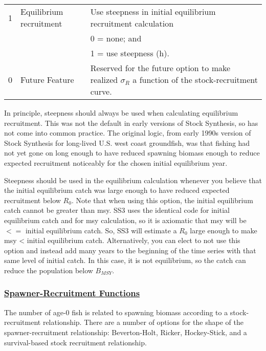 \begin{longtable}{p{1cm} p{3cm} p{11cm}}
	\hline

	1 \Tstrut & Equilibrium recruitment & Use steepness in initial equilibrium recruitment calculation \\
	  & 						& 0 = none; and \\
	  &							& 1 = use steepness (h). \\
	0 & Future Feature			& Reserved for the future option to make realized $\sigma_R$ a function of the stock-recruitment curve. \Bstrut\\ 
	\hline
\end{longtable}

\hypertarget{EquilRecr}{}
In principle, steepness should always be used when calculating equilibrium recruitment. This was not the default in early versions of Stock Synthesis, so has not come into common practice. The original logic, from early 1990s version of Stock Synthesis for long-lived U.S. west coast groundfish, was that fishing had not yet gone on long enough to have reduced spawning biomass enough to reduce expected recruitment noticeably for the chosen initial equilibrium year.

Steepness should be used in the equilibrium calculation whenever you believe that the initial equilibrium catch was large enough to have reduced expected recruitment below $R_{0}$. Note that when using this option, the initial equilibrium catch cannot be greater than \gls{msy}. SS3 uses the identical code for initial equilibrium catch and for \gls{msy} calculation, so it is axiomatic that \gls{msy} will be $<=$ initial equilibrium catch. So, SS3 will estimate a $R_{0}$ large enough to make \gls{msy} < initial equilibrium catch. Alternatively, you can elect to not use this option and instead add many years to the beginning of the time series with that same level of initial catch. In this case, it is not equilibrium, so the catch can reduce the population below $B_{MSY}$.

\hypertarget{SRRFunc}{}
\subsubsection[Spawner-Recruitment Functions]{\protect\hyperlink{SRRFunc}{Spawner-Recruitment Functions}}
The number of age-0 fish is related to spawning biomass according to a stock-recruitment relationship. There are a number of options for the shape of the spawner-recruitment relationship: Beverton-Holt, Ricker, Hockey-Stick, and a survival-based stock recruitment relationship.

